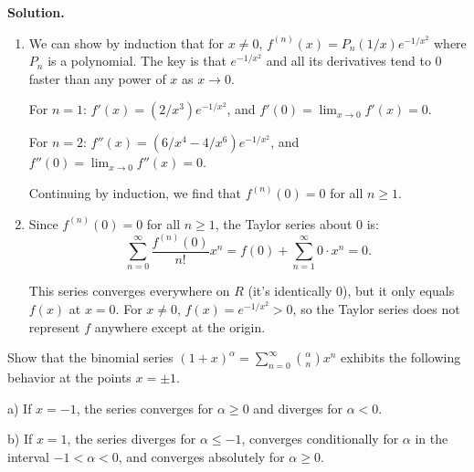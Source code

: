 \noindent\textbf{Solution.}
\begin{enumerate}[label=(\alph*)]
\item We can show by induction that for \( x \neq 0 \), \( f^{(n)}(x) = P_n(1/x)e^{-1/x^2} \) where \( P_n \) is a polynomial. The key is that \( e^{-1/x^2} \) and all its derivatives tend to 0 faster than any power of \( x \) as \( x \to 0 \).

For \( n = 1 \): \( f'(x) = (2/x^3)e^{-1/x^2} \), and \( f'(0) = \lim_{x \to 0} f'(x) = 0 \).

For \( n = 2 \): \( f''(x) = (6/x^4 - 4/x^6)e^{-1/x^2} \), and \( f''(0) = \lim_{x \to 0} f''(x) = 0 \).

Continuing by induction, we find that \( f^{(n)}(0) = 0 \) for all \( n \geq 1 \).

\item Since \( f^{(n)}(0) = 0 \) for all \( n \geq 1 \), the Taylor series about 0 is:
\[\sum_{n=0}^{\infty} \frac{f^{(n)}(0)}{n!}x^n = f(0) + \sum_{n=1}^{\infty} 0 \cdot x^n = 0.\]

This series converges everywhere on \( R \) (it's identically 0), but it only equals \( f(x) \) at \( x = 0 \). For \( x \neq 0 \), \( f(x) = e^{-1/x^2} > 0 \), so the Taylor series does not represent \( f \) anywhere except at the origin.
\end{enumerate}

\begin{problembox}
Show that the binomial series \( (1 + x)^\alpha = \sum_{n=0}^\infty \binom{\alpha}{n} x^n \) exhibits the following behavior at the points \( x = \pm 1 \).

a) If \( x = -1 \), the series converges for \( \alpha \geq 0 \) and diverges for \( \alpha < 0 \).

b) If \( x = 1 \), the series diverges for \( \alpha \leq -1 \), converges conditionally for \( \alpha \) in the interval \(-1 < \alpha < 0 \), and converges absolutely for \( \alpha \geq 0 \).
\end{problembox}

